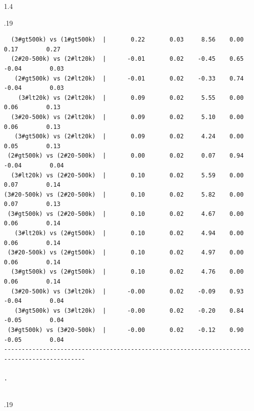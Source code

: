 \documentclass[10pt, letterpaper]{article}
\begin{document}
\begin{spacing}{1.4}
\begin{scriptsize}
\begin{spacing}{.19}
\begin{verbatim}
  (3#gt500k) vs (1#gt500k)  |       0.22       0.03     8.56    0.00         0.17        0.27
  (2#20-500k) vs (2#lt20k)  |      -0.01       0.02    -0.45    0.65        -0.04        0.03
   (2#gt500k) vs (2#lt20k)  |      -0.01       0.02    -0.33    0.74        -0.04        0.03
    (3#lt20k) vs (2#lt20k)  |       0.09       0.02     5.55    0.00         0.06        0.13
  (3#20-500k) vs (2#lt20k)  |       0.09       0.02     5.10    0.00         0.06        0.13
   (3#gt500k) vs (2#lt20k)  |       0.09       0.02     4.24    0.00         0.05        0.13
 (2#gt500k) vs (2#20-500k)  |       0.00       0.02     0.07    0.94        -0.04        0.04
  (3#lt20k) vs (2#20-500k)  |       0.10       0.02     5.59    0.00         0.07        0.14
(3#20-500k) vs (2#20-500k)  |       0.10       0.02     5.82    0.00         0.07        0.13
 (3#gt500k) vs (2#20-500k)  |       0.10       0.02     4.67    0.00         0.06        0.14
   (3#lt20k) vs (2#gt500k)  |       0.10       0.02     4.94    0.00         0.06        0.14
 (3#20-500k) vs (2#gt500k)  |       0.10       0.02     4.97    0.00         0.06        0.14
  (3#gt500k) vs (2#gt500k)  |       0.10       0.02     4.76    0.00         0.06        0.14
  (3#20-500k) vs (3#lt20k)  |      -0.00       0.02    -0.09    0.93        -0.04        0.04
   (3#gt500k) vs (3#lt20k)  |      -0.00       0.02    -0.20    0.84        -0.05        0.04
 (3#gt500k) vs (3#20-500k)  |      -0.00       0.02    -0.12    0.90        -0.05        0.04
---------------------------------------------------------------------------------------------

. 


\end{verbatim}
\end{spacing}{.19}
\end{scriptsize}


\end{spacing}
\end{document}
